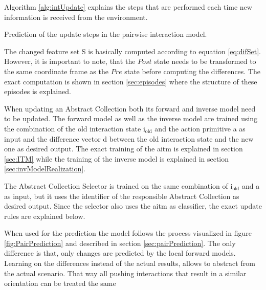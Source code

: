 Algorithm \ref{alg:intUpdate} explains the steps that are performed each time new information is received from the environment.

\begin{algorithm}
	\BlankLine
	\caption{Prediction of the update steps in the pairwise interaction model.}
	\label{alg:intUpdate}
\end{algorithm}

The changed feature set S is basically computed according to equation \ref{eq:difSet}. However, it is important to note, that the $Post$ state needs to be transformed to the same coordinate frame as the $Pre$ state before computing the differences. The exact computation is shown in section \ref{sec:episodes} where the structure of these episodes is explained.

When updating an Abstract Collection both its forward and inverse model need to be updated. The forward model as well as the inverse model are trained using the combination of the old interaction state i$_\text{old}$ and the action primitive a as input and the difference vector d between the old interaction state and the new one as desired output. The exact training of the \gls{aitm} is explained in section \ref{sec:ITM} while the training of the inverse model is explained in section \ref{sec:invModelRealization}.

The Abstract Collection Selector is trained on the same combination of i$_\text{old}$ and a as input, but it uses the identifier of the responsible Abstract Collection as desired output.
Since the selector also uses the \gls{aitm} as classifier, the exact update rules are explained below.

When used for the prediction the model follows the process visualized in figure \ref{fig:PairPrediction} and described in section \ref{sec:pairPrediction}. The only difference is that, only changes are predicted by the local forward models. Learning on the differences instead of the actual results, allows to abstract from the actual scenario. That way all pushing interactions that result in a similar orientation can be treated the same


